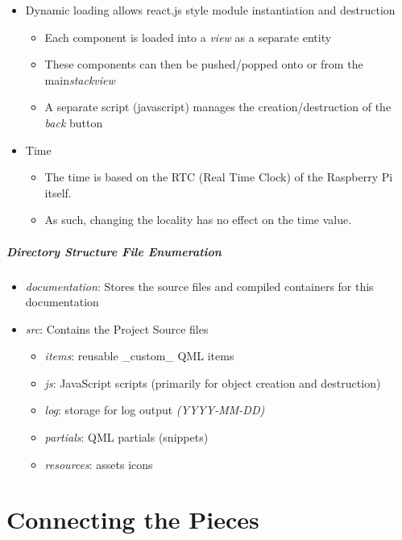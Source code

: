 \documentclass{article}
\begin{document}
\begin{itemize}
\item
  Dynamic loading allows react.js style module instantiation and destruction

  \begin{itemize}
  \item
    Each component is loaded into a \emph{view} as a separate entity
  \item
    These components can then be pushed/popped onto or from the
    main\emph{stackview}
  \item
    A separate script (javascript) manages the creation/destruction of
    the \emph{back} button
  \end{itemize}
\item
  Time

  \begin{itemize}
  \item
    The time is based on the RTC (Real Time Clock) of the Raspberry Pi
    itself.
  \item
    As such, changing the locality has no effect on the time value.
  \end{itemize}
\end{itemize}

\subparagraph{Directory Structure \textbar{} File Enumeration}
\begin{itemize}
    \item \emph{documentation}: Stores the source files and compiled containers for this documentation\\
    \item \emph{src}: Contains the Project Source files

    \begin{itemize}
        \item \emph{items}: reusable \_custom\_ QML items
        \item \emph{js}: JavaScript scripts (primarily for object creation and destruction)
        \item \emph{log}: storage for log output \emph{(YYYY-MM-DD)}
        \item \emph{partials}: QML partials (snippets)
        \item \emph{resources}: assets \textbar{} icons
    \end{itemize}
\end{itemize}



\hypertarget{connecting-the-pieces}{%
\section{Connecting the Pieces}\label{connecting-the-pieces}}
\end{document}
